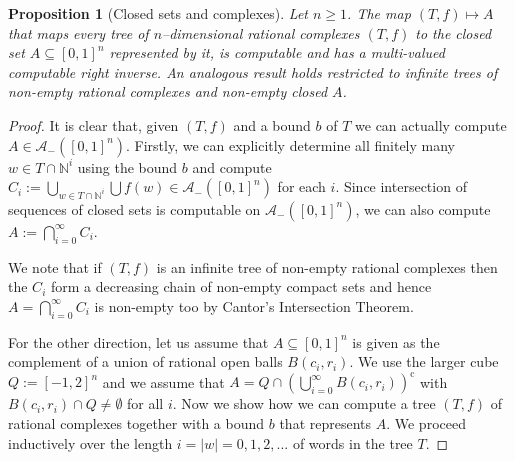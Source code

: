 \documentclass[a4paper]{amsart}
\def\AA{{\mathcal A}}
\def\IN{{\mathbb{N}}}
\def\In{\subseteq}
\def\cc{\mathrm c}
\newtheorem{proposition}[theorem]{Proposition}
\theoremstyle{definition}
\begin{document}
\begin{proposition}[Closed sets and complexes]
\label{prop:complexes}
Let $n\geq1$.
The map $(T,f)\mapsto A$ that maps every tree of $n$--dimensional rational complexes $(T,f)$ to the closed set $A\In[0,1]^n$ represented by it,
is computable and has a multi-valued computable right inverse.
An analogous result holds restricted to infinite trees of non-empty rational complexes and non-empty closed $A$.
\end{proposition}
\begin{proof}
It is clear that, given $(T,f)$ and a bound $b$ of $T$ we can actually compute $A\in\AA_-([0,1]^n)$.
Firstly, we can explicitly determine all finitely many $w\in T\cap\IN^i$ using the bound $b$
and compute $C_i:=\bigcup_{w\in T\cap\IN^i}\bigcup f(w)\in\AA_-([0,1]^n)$ for each $i$.
Since intersection of sequences of closed sets is computable on $\AA_-([0,1]^n)$, we can also compute $A:=\bigcap_{i=0}^\infty C_i$.

We note that if $(T,f)$ is an infinite tree of non-empty rational complexes then the $C_i$ form a decreasing chain of non-empty compact sets
and hence $A=\bigcap_{i=0}^\infty C_i$ is non-empty too by Cantor's Intersection Theorem.

For the other direction, let us assume that $A\In[0,1]^n$ is given as the complement of a union of rational open balls $B(c_i,r_i)$.
We use the larger cube $Q:=[-1,2]^n$ and we assume that $A=Q\cap(\bigcup_{i=0}^\infty B(c_i,r_i))^\cc$ with $B(c_i,r_i)\cap Q\not=\emptyset$ for all $i$.
Now we show how we can compute a tree $(T,f)$ of rational complexes together with a bound $b$ that represents $A$.
We proceed inductively over the length $i=|w|=0,1,2,...$ of words in the tree $T$.


\end{proof}
\end{document}
